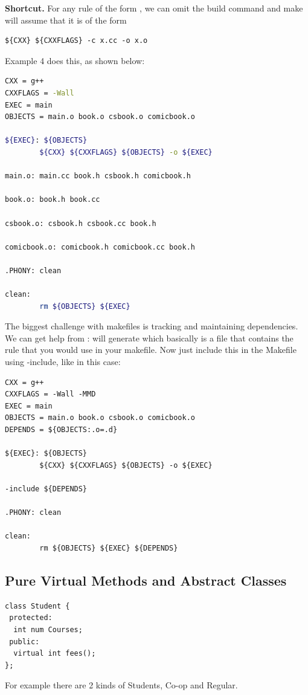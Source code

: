\documentclass[english, 11pt]{article}
\begin{document}
\textbf{Shortcut.} For any rule of the form , we can omit the build command and make will assume that it is of the form
\begin{lstlisting}
${CXX} ${CXXFLAGS} -c x.cc -o x.o
\end{lstlisting}
Example 4 does this, as shown below:
\begin{lstlisting}[language=bash]
CXX = g++
CXXFLAGS = -Wall
EXEC = main
OBJECTS = main.o book.o csbook.o comicbook.o

${EXEC}: ${OBJECTS}
        ${CXX} ${CXXFLAGS} ${OBJECTS} -o ${EXEC}

main.o: main.cc book.h csbook.h comicbook.h

book.o: book.h book.cc

csbook.o: csbook.h csbook.cc book.h

comicbook.o: comicbook.h comicbook.cc book.h

.PHONY: clean

clean:
        rm ${OBJECTS} ${EXEC}
\end{lstlisting}
The biggest challenge with makefiles is tracking and maintaining dependencies. We can get help from :  will generate  which basically is a file that contains the rule that you would use in your makefile. Now just include this in the Makefile using -include, like in this case:
\begin{lstlisting}
CXX = g++
CXXFLAGS = -Wall -MMD
EXEC = main
OBJECTS = main.o book.o csbook.o comicbook.o
DEPENDS = ${OBJECTS:.o=.d}

${EXEC}: ${OBJECTS}
        ${CXX} ${CXXFLAGS} ${OBJECTS} -o ${EXEC}

-include ${DEPENDS}

.PHONY: clean

clean:
        rm ${OBJECTS} ${EXEC} ${DEPENDS}
\end{lstlisting}

\subsection{Pure Virtual Methods and Abstract Classes}

\begin{lstlisting}
class Student {
 protected:
  int num Courses;
 public:
  virtual int fees();
};
\end{lstlisting}

For example there are 2 kinds of Students, Co-op and Regular.
\end{document}
